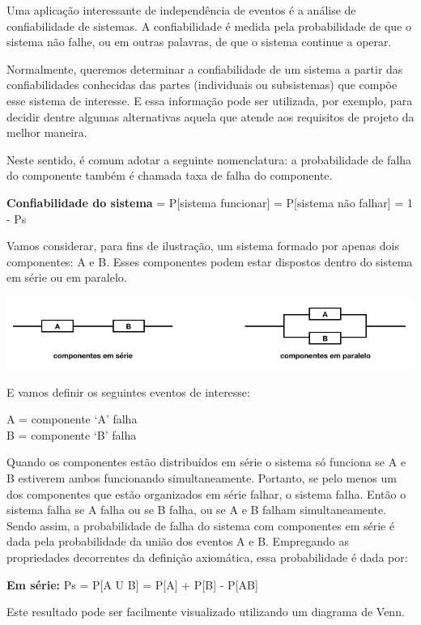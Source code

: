 \documentclass[
]{book}
\theoremstyle{definition}
\theoremstyle{definition}
\theoremstyle{definition}
\theoremstyle{remark}
\begin{document}
Uma aplicação interessante de independência de eventos é a análise de confiabilidade de sistemas. A confiabilidade é medida pela probabilidade de que o sistema não falhe, ou em outras palavras, de que o sistema continue a operar.

Normalmente, queremos determinar a confiabilidade de um sistema a partir das confiabilidades conhecidas das partes (individuais ou subsistemas) que compõe esse sistema de interesse. E essa informação pode ser utilizada, por exemplo, para decidir dentre algumas alternativas aquela que atende aos requisitos de projeto da melhor maneira.

Neste sentido, é comum adotar a seguinte nomenclatura: a probabilidade de falha do componente também é chamada taxa de falha do componente.

\textbf{Confiabilidade do sistema} = P{[}sistema funcionar{]} = P{[}sistema não falhar{]} = 1 - Ps

Vamos considerar, para fins de ilustração, um sistema formado por apenas dois componentes: A e B. Esses componentes podem estar dispostos dentro do sistema em série ou em paralelo.

\includegraphics[width=1\linewidth]{img/confiabilidade}

E vamos definir os seguintes eventos de interesse:

A = componente `A' falha\\
B = componente `B' falha

Quando os componentes estão distribuídos em série o sistema só funciona se A e B estiverem ambos funcionando simultaneamente. Portanto, se pelo menos um dos componentes que estão organizados em série falhar, o sistema falha. Então o sistema falha se A falha ou se B falha, ou se A e B falham simultaneamente. Sendo assim, a probabilidade de falha do sistema com componentes em série é dada pela probabilidade da união dos eventos A e B. Empregando as propriedades decorrentes da definição axiomática, essa probabilidade é dada por:

\textbf{Em série:} Ps = P{[}A U B{]} = P{[}A{]} + P{[}B{]} - P{[}AB{]}

Este resultado pode ser facilmente visualizado utilizando um diagrama de Venn.
\end{document}
